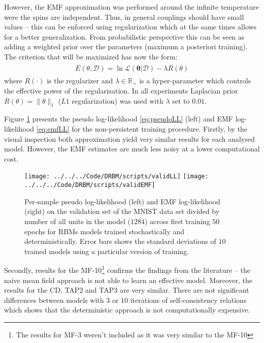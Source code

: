 \documentclass[../report/report.tex]{subfiles}
\begin{document}
However, the EMF approximation was performed around the infinite temperature were the spins are independent. Thus, in general couplings should have small values -- this can be enforced using regularization which at the same times allows for a better generalization. From probabilistic perspective this can be seen as adding a weighted prior over the parameters (maximum a posteriori training). The criterion that will be maximized has now the form:
\begin{align}
\begin{split}
E(\theta, \mathcal{D}) = \ln \mathcal{L}(\mathbf{\theta}| \mathcal{D}) - \lambda R(\theta)
\end{split}
\end{align}
where $R(\cdot)$ is the regularizer and $\lambda \in \mathbb{R}_+$ is a hyper-parameter which controls the effective power of the regularization.
In all experiments Laplacian prior $R(\theta) = \| \theta \|_1$ ($L1$ regularization) was used with $\lambda$ set to $0.01$. 

Figure \ref{fig:validLL} presents the pseudo log-likelihood \ref{eq:pseudoLL} (left) and EMF log-likelihood \ref{eq:emfLL} for the non-persistent training procedure. Firstly, by the visual inspection both approximation yield very similar results for each analysed model. However, the EMF estimates are much less noisy at a lower computational cost.

\begin{figure}[!htb]
%
  \texttt{[image: ../../../Code/DRBM/scripts/validLL]}
\endminipage 
{}  
 \texttt{[image: ../../../Code/DRBM/scripts/validEMF]}
\endminipage\hfill
  \caption[1]{Per-sample pseudo log-likelihood (left) and EMF log-likelihood (right) on the validation set of the MNIST data set divided by number of all units in the model ($1284$) across first training $50$ epochs for RBMs models trained stochastically and deterministically. Error bars shows the standard deviations of $10$ trained models using a particular version of training.}
   \label{fig:validLL}
\end{figure}
Secondly, results for the MF-10\footnote{The results for MF-3 weren't included as it was very similar to the MF-10} confirms the findings from the literature -- the naive mean field approach is not able to learn an effective model. Moreover, the results for the CD, TAP2 and TAP3 are very similar. There are not significant differences between models with $3$ or $10$ iterations of self-consistency relations which shows that the deterministic approach is not computationally expensive. 
\end{document}
